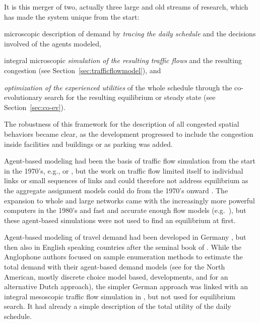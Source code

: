 
It is this merger of two, actually three large and old streams of research, which has made the system unique from the start: 
\begin{compactitem}
\item microscopic description of demand by \emph{tracing the daily schedule} and the decisions involved of the agents modeled, 
%
\item integral microscopic \emph{simulation of the resulting traffic flows} and the resulting congestion (see Section~\ref{sec:trafficflowmodel}), and
%
\item  \emph{optimization of the experienced utilities} of the whole schedule through the co-evolutionary search for the resulting equilibrium or steady state (see Section~\ref{sec:co-ev}). 
%
\end{compactitem}
The robustness of this framework for the description of all congested spatial behaviors became clear, as the development progressed to include the congestion inside facilities and buildings or as parking was added. 

Agent-based modeling had been the basis of traffic flow simulation from the start in the 1970’s, e.g., \citet[][]{Wiedemann_PhDThesis_1974} or \citet[][]{Seddon_Simulation_1972}, but the work on traffic flow limited itself to individual links or small sequences of links and could therefore not address equilibrium as the aggregate assignment models could do from the 1970’s onward \citep[see][]{OrtuzarWillumsen_2011}. The expansion to whole and large networks came with the increasingly more powerful computers in the 1980’s and fast and accurate enough flow models (e.g.\ \citet[][]{NagelSchreckenberg_JdPI_1992, Schwerdtfeger_VolmulerHamerslag_1984, Daganzo_TransResPartB_1994}), but these agent-based simulations were not used to find an equilibrium at first. 

Agent-based modeling of travel demand had been developed in Germany \citep[][]{AxhausenHerz_JTE_1989}, but then also in English speaking countries after the seminal book of \citet[][]{JonesEtAl_1983}.    While the Anglophone authors focused on sample enumeration methods to estimate the total demand with their agent-based demand models (see \citet[see][]{BradleyBowman_TRBTDF_2006} for the North American, mostly discrete choice model based, developments, and \citet[][]{ArentzeTimmermans_2000} for an alternative Dutch approach), the simpler German approach was linked with an integral mesoscopic traffic flow simulation in \citet[][]{Axhausen_PhDThesis_1988}, but not used for equilibrium search. It had already a simple description of the total utility of the daily schedule.


